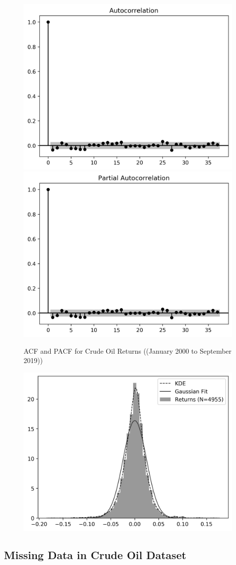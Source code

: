 \documentclass[12pt]{article}
\begin{document}
	\begin{figure}[H]
		\centering
		\includegraphics[width=0.45\linewidth]{figures/wti_summary/returns_acf.png}
		\includegraphics[width=0.45\linewidth]{figures/wti_summary/returns_pacf.png}
		\caption{ACF and PACF for Crude Oil Returns ((January 2000 to September 2019))}
	\end{figure}

	\begin{figure}[H]
		\centering
		\includegraphics{figures/wti_summary/return_hist.png}
		\caption{\todo{}}
	\end{figure}	

	\subsection{Missing Data in Crude Oil Dataset}
\end{document}
